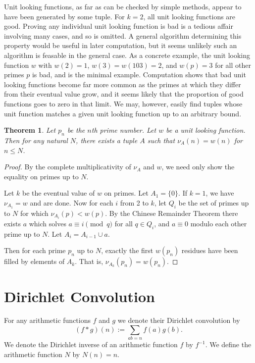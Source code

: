 \documentclass[11pt, leqno]{article}
\newtheorem{theorem}{Theorem}[section]
\begin{document}
Unit looking functions, as far as can be checked by simple methods, appear
to have been generated by some tuple.
For $k=2$, all unit looking functions are good.
Proving any individual unit looking function is bad is a tedious
affair involving many cases, and so is omitted.
A general algorithm determining this property would be useful in
later computation, but it seems unlikely such an algorithm is feasable
in the general case.
As a concrete example, the unit looking function 
$w$ with $w(2)=1$, $w(3)=w(103)=2$, and $w(p)=3$ for all other primes $p$
is bad, and is the minimal example.
Computation shows that bad unit looking functions become far more common
as the primes at which they differ from their eventual value grow,
and it seems likely that the proportion of good functions goes to zero
in that limit.
We may, however, easily find tuples whose unit function matches a given unit looking function up 
to an arbitrary bound.

\begin{theorem}
    Let $p_n$ be the $n$th prime number.
    Let $w$ be a unit looking function.
    Then for any natural $N$, there exists a 
    tuple $A$ such that $\nu_A(n)=w(n)$ for $n \leq N$.
\end{theorem}
\begin{proof}
    By the complete multiplicativity of $\nu_A$ and $w$,
    we need only show the equality on primes up to $N$.

    Let $k$ be the eventual value of $w$ on primes.
    Let $A_1=\{0\}$.
    If $k=1$, we have $\nu_{A_1}=w$ and are done.
    Now for each $i$ from 2 to $k$, let $Q_i$ be the set of primes up to $N$ for 
    which $\nu_{A_i}(p)<w(p)$.
    By the Chinese Remainder Theorem there exists $a$ which solves $a\equiv i \pmod q$
    for all $q\in Q_i$, and $a\equiv 0$ modulo each other prime up to $N$.
    Let $A_i=A_{i-1}\cup a$.

    Then for each prime $p_n$ up to $N$, exactly the first $w(p_n)$ residues 
    have been filled by elements of $A_k$. 
    That is, $\nu_{A_k}(p_n)=w(p_n)$.
\end{proof}
    
\section{Dirichlet Convolution}
For any arithmetic functions $f$ and $g$ we denote their Dirichlet convolution by
$$(f\ast g)(n) := \sum_{ab=n}f(a)g(b).$$
We denote the Dirichlet inverse of an arithmetic function $f$ by $f^{-1}$.
We define the arithmetic function $N$ by $N(n)=n$.
\end{document}
